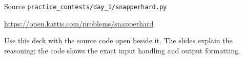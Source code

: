 \documentclass[aspectratio=169,11pt]{beamer}
\begin{document}
\begin{frame}{Source}
\small
{} \texttt{practice\_contests/day\_1/snapperhard.py}

\vspace{0.3cm}
 \url{https://open.kattis.com/problems/snapperhard}

\vspace{0.45cm}
Use this deck with the source code open beside it. The slides explain the reasoning; the code shows the exact input handling and output formatting.
\end{frame}
\end{document}
